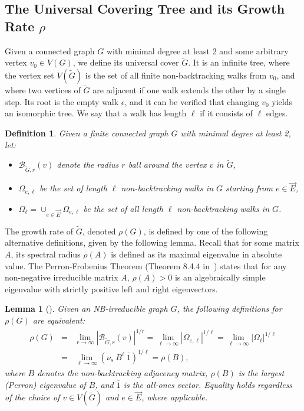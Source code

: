 \documentclass{article}
\newtheorem{definition}[theorem]{Definition}
\newtheorem{lemma}[theorem]{Lemma}
\newcommand{\dirE}{\vec{E}}
\begin{document}
\subsection{The Universal Covering Tree and its Growth Rate $\rho$}\label{subsection:universal}
Given a connected graph $G$ with minimal degree at least 2 and some arbitrary vertex $v_0 \in V(G)$, 
we define its universal cover $\tilde{G}$.
It is an infinite tree, where the vertex set $V(\tilde{G})$ is the set of all finite non-backtracking walks from $v_0$, 
and where two vertices of $\tilde{G}$ are adjacent if one walk extends the other by a single step.
Its root is the empty walk $\epsilon$, and it can be verified that 
changing $v_0$ yields an isomorphic tree. We say that a walk has length $\ell$ if it consists of $\ell$ edges.

\begin{definition}
    Given a finite connected graph $G$ with minimal degree at least 2, let:
    \begin{itemize}
        \item $\mathcal{B}_{\tilde{G},r}(v)$ denote the radius $r$ ball around the vertex $v$ in $\tilde{G}$, 
        \item $\Omega_{e,\ell}$ be the set of length $\ell$ non-backtracking walks in $G$ starting from $e \in \dirE$,
        \item $\Omega_\ell = \cup_{e \in \dirE} \Omega_{e,\ell}$ be the set of all length $\ell$ non-backtracking walks in $G$.
    \end{itemize}
\end{definition}

\noindent
The growth rate of $\tilde{G}$, denoted $\rho(G)$, is defined by one of the following alternative definitions, given by the following lemma. Recall that for some matrix $A$, its spectral radius $\rho(A)$ is defined as its maximal eigenvalue in absolute value. The Perron-Frobenius Theorem (Theorem 8.4.4 in~\cite{horn2012matrix}) states that for any non-negative irreducible matrix $A$, $\rho(A)>0$ is an algebraically simple eigenvalue with strictly positive left and right eigenvectors. 

\begin{lemma}[\cite{angel2015non,hoory2024girth}]\label{lemma:rho_Perron}
    Given an NB-irreducible graph $G$, the following definitions for $\rho(G)$ are equivalent:        
    \begin{eqnarray*}
        \rho(G) 
            &=& \lim_{r \rightarrow \infty} |\mathcal{B}_{\tilde{G},r}(v)|^{1/r} 
            =   \lim_{\ell \rightarrow \infty} |\Omega_{e,\ell}|^{1/\ell}
            =   \lim_{\ell  \rightarrow \infty} |\Omega_\ell|^{1/\ell} \\
            &=& \lim_{\ell \rightarrow \infty} \left( \nu_s \ B^\ell \ \overline{1} \right)^{1/\ell}
            = \rho(B),
    \end{eqnarray*}
    where $B$ denotes the non-backtracking adjacency matrix, $\rho(B)$ is the largest (Perron) eigenvalue of $B$, and $\overline{1}$ is the all-ones vector.
    Equality holds regardless of the choice of $v \in V(\tilde{G})$ and $e \in \dirE$, where applicable.
\end{lemma}
\end{document}
